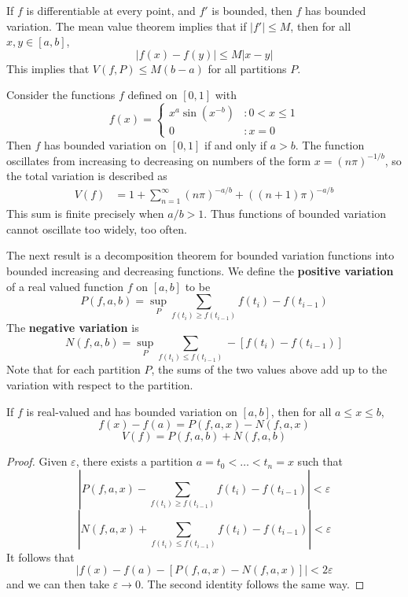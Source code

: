 \begin{example}
    If $f$ is differentiable at every point, and $f'$ is bounded, then $f$ has bounded variation. The mean value theorem implies that if $|f'| \leq M$, then for all $x,y \in [a,b]$,
    \[ |f(x) - f(y)| \leq M |x-y| \]
    This implies that $V(f,P) \leq M(b-a)$ for all partitions $P$.
\end{example}

\begin{example}
    Consider the functions $f$ defined on $[0,1]$ with
    \[ f(x) = \begin{cases} x^a \sin(x^{-b}) &: 0 < x \leq 1 \\ 0 &: x = 0 \end{cases} \]
    Then $f$ has bounded variation on $[0,1]$ if and only if $a > b$. The function oscillates from increasing to decreasing on numbers of the form $x = (n \pi)^{-1/b}$, so the total variation is described as
    \begin{align*}
      V(f) &= 1 + \sum_{n = 1}^\infty (n \pi)^{-a/b} + ((n+1) \pi)^{-a/b}
    \end{align*}
    This sum is finite precisely when $a/b > 1$. Thus functions of bounded variation cannot oscillate too widely, too often.
\end{example}

The next result is a decomposition theorem for bounded variation functions into bounded increasing and decreasing functions. We define the {\bf positive variation} of a real valued function $f$ on $[a,b]$ to be
%
\[ P(f,a,b) = \sup_P \sum_{f(t_i) \geq f(t_{i-1})} f(t_i) - f(t_{i-1}) \]
%
The {\bf negative variation} is
%
\[ N(f,a,b) = \sup_P \sum_{f(t_i) \leq f(t_{i-1})} -[f(t_i) - f(t_{i-1})] \]
%
Note that for each partition $P$, the sums of the two values above add up to the variation with respect to the partition.

\begin{lemma}
    If $f$ is real-valued and has bounded variation on $[a,b]$, then for all $a \leq x \leq b$,
    \[ f(x) - f(a) = P(f,a,x) - N(f,a,x) \]
    \[ V(f) = P(f,a,b) + N(f,a,b) \]
\end{lemma}
\begin{proof}
    Given $\varepsilon$, there exists a partition $a = t_0 < \dots < t_n = x$ such that
    \[ \left| P(f,a,x) - \sum_{f(t_i) \geq f(t_{i-1})} f(t_i) - f(t_{i-1}) \right| < \varepsilon \]
    \[ \left| N(f,a,x) + \sum_{f(t_i) \leq f(t_{i-1})} f(t_i) - f(t_{i-1}) \right| < \varepsilon \]
    It follows that
    \[ |f(x) - f(a) - [P(f,a,x) - N(f,a,x)]| < 2 \varepsilon \]
    and we can then take $\varepsilon \to 0$. The second identity follows the same way.
\end{proof}

